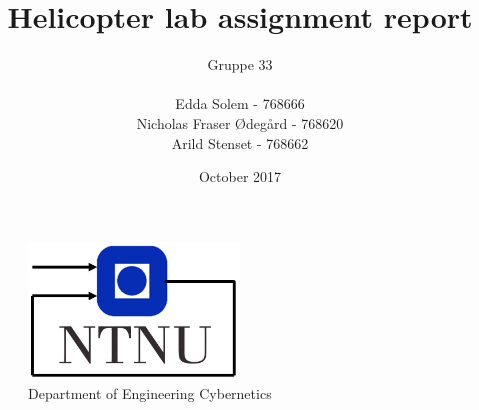 \documentclass[11pt, a4paper]{article}
\title{Helicopter lab assignment report}
\author{Gruppe 33\\ \\Edda Solem - 768666\\Nicholas Fraser Ødegård - 768620\\ Arild Stenset - 768662 }
\date{October 2017}
\begin{document}
\begin{titlepage}
    \maketitle
    \begin{figure}
    \centering
    \includegraphics[width=0.5\textwidth]{figures/itk_ntnu}\\
    Department of Engineering Cybernetics
    \end{figure}
    \thispagestyle{empty}
\end{titlepage}

\maketitle

\newpage
\tableofcontents
\thispagestyle{empty} %

\newpage
\setcounter{page}{1}









\newpage
\nocite{*}
\end{document}
